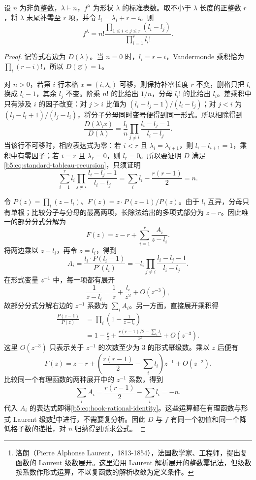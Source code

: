 \begin{lemma}\label{b5:lem:tableau-vandermonde}
	设 \(n\) 为非负整数，\(\lambda\vdash n\)，\(f^\lambda\) 为形状 \(\lambda\) 的标准表数。取不小于 \(\lambda\) 长度的正整数 \(r\)，将 \(\lambda\) 末尾补零至 \(r\) 项，并令 \(l_i=\lambda_i+r-i\)。则
	\begin{equation}\label{b5:eq:tableau-vandermonde}
		f^\lambda =n!\frac{\prod_{1\leq i<j\leq r}(l_i-l_j)} {\prod_{i=1}^r l_i!}.
	\end{equation}
\end{lemma}
\begin{proof}
	记等式右边为 \(D(\lambda)\)。当 \(n=0\) 时，\(l_i=r-i\)，Vandermonde 乘积恰为 \(\prod_i(r-i)!\)，所以 \(D(\varnothing)=1\)。

	对 \(n>0\)，若第 \(i\) 行末格 \(x=(i,\lambda_i)\) 可移，则保持补零长度 \(r\) 不变，删格只把 \(l_i\) 换成 \(l_i-1\)，其余 \(l_j\) 不变。阶乘 \(n!\) 的比给出 \(1/n\)，分母 \(l_i!\) 的比给出 \(l_i\)。差乘积中只有涉及 \(i\) 的因子改变：对 \(j>i\) 比值为 \((l_i-l_j-1)/(l_i-l_j)\)；对 \(j<i\) 为 \((l_j-l_i+1)/(l_j-l_i)\)，将分子分母同时变号便得到同一形式。所以相除得到
	\[
		\frac{D(\lambda\setminus x)}{D(\lambda)} =\frac{l_i}{n} \prod_{j\ne i}\frac{l_i-l_j-1}{l_i-l_j}.
	\]
	当该行不可移时，相应表达式为零：若 \(i<r\) 且 \(\lambda_i=\lambda_{i+1}\)，则 \(l_i-l_{i+1}=1\)，乘积中有零因子；若 \(i=r\) 且 \(\lambda_r=0\)，则 \(l_r=0\)。所以要证明 \(D\) 满足\eqref{b5:eq:standard-tableau-recursion}，只须证明
	\begin{equation}\label{b5:eq:hook-rational-identity}
		\sum_{i=1}^r l_i \prod_{j\ne i}\frac{l_i-l_j-1}{l_i-l_j} =\sum_i l_i-\frac{r(r-1)}2=n.
	\end{equation}

	令 \(P(z)=\prod_i(z-l_i)\)、\(F(z)=z\cdot P(z-1)/P(z)\)。由于 \(l_i\) 互异，分母只有单根；比较分子与分母的最高两项，长除法给出的多项式部分为 \(z-r\)。因此唯一的部分分式分解为
	\[
		F(z)=z-r+\sum_{i=1}^r\frac{A_i}{z-l_i}.
	\]
	将两边乘以 \(z-l_i\)，再令 \(z=l_i\)，得到
	\[
		A_i=\frac{l_i\cdot P(l_i-1)}{P'(l_i)} =-l_i\prod_{j\ne i}\frac{l_i-l_j-1}{l_i-l_j}.
	\]
	在形式变量 \(z^{-1}\) 中，每一项都有展开
	\[
		\frac1{z-l_i}=\frac1z+\frac{l_i}{z^2}+O(z^{-3}),
	\]
	故部分分式分解右边的 \(z^{-1}\) 系数为 \(\sum_iA_i\)。另一方面，直接展开乘积得
	\[
		\begin{aligned}
			\frac{P(z-1)}{P(z)} &=\prod_i\left(1-\frac1{z-l_i}\right)\\
			&=1-\frac rz+ \frac{r(r-1)/2-\sum_i l_i}{z^2}+O(z^{-3}).
		\end{aligned}
	\]
	这里 \(O(z^{-3})\) 只表示关于 \(z^{-1}\) 的次数至少为 \(3\) 的形式幂级数。乘以 \(z\) 后便有
	\[
		F(z)=z-r+ \left(\frac{r(r-1)}2-\sum_i l_i\right)z^{-1}+O(z^{-2}).
	\]
	比较同一个有理函数的两种展开中的 \(z^{-1}\) 系数，得到
	\[
		\sum_iA_i=\frac{r(r-1)}2-\sum_i l_i=-n.
	\]
	代入 \(A_i\) 的表达式即得\eqref{b5:eq:hook-rational-identity}。这些运算都在有理函数与形式 Laurent 级数\footnote{洛朗（Pierre Alphonse Laurent，1813-1854），法国数学家、工程师，提出复函数的 Laurent 级数展开。这里沿用 Laurent 解析展开的整数幂记法，但级数按系数作形式运算，不以复函数的解析收敛为定义条件。}中进行，不需要复分析。因此 \(D\) 与 \(f\) 有同一个初值和同一个降低格子数的递推，对 \(n\) 归纳得到所求公式。
\end{proof}

